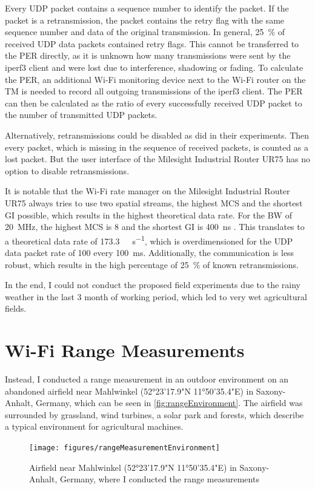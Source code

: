Every \ac{UDP} packet contains a sequence number to identify the packet.
If the packet is a retransmission, the packet contains the retry flag
with the same sequence number and data of the original transmission.
In general, \SI{25}{\percent} of received \ac{UDP} data packets contained retry flags.
This cannot be transferred to the \ac{PER} directly,
as it is unknown how many transmissions were sent by the iperf3 client and were lost due to interference, shadowing or fading.
To calculate the \ac{PER}, an additional Wi-Fi monitoring device next to the Wi-Fi router on the \ac{TM} is needed to record all
outgoing transmissions of the iperf3 client.
The \ac{PER} can then be calculated as the ratio of every successfully received \ac{UDP} packet to the number of transmitted \ac{UDP} packets.

Alternatively, retransmissions could be disabled as \textcite{klingler_agriculture_2018} did in their experiments.
Then every packet, which is missing in the sequence of received packets, is counted as a lost packet.
But the user interface of the Milesight Industrial Router UR75 has no option to disable retransmissions.

It is notable that the Wi-Fi rate manager on the Milesight Industrial Router UR75 always tries to use two spatial streams, the highest \ac{MCS} and the shortest \ac{GI} possible,
which results in the highest theoretical data rate.
For the \ac{BW} of \SI{20}{\mega\hertz}, the highest \ac{MCS} is \num{8} and the shortest \ac{GI} is \SI{400}{\nano\second} \cite{ieee_standard_2020}.
This translates to a theoretical data rate of \SI{173.3}{\mega\bit\per\second}, which is overdimensioned for the \ac{UDP} data packet rate of \SI{100}{\byte}
every \SI{100}{\milli\second}.
Additionally, the communication is less robust, which results in the high percentage of \SI{25}{\percent} of known retransmissions.

In the end, I could not conduct the proposed field experiments due to the rainy weather in the last \num{3} month of working period, which led to very wet agricultural fields.

\section{Wi-Fi Range Measurements}
Instead, I conducted a range measurement in an outdoor environment on an abandoned airfield near Mahlwinkel (52°23'17.9"N 11°50'35.4"E) in Saxony-Anhalt, Germany,
which can be seen in \autoref{fig:rangeEnvironment}.
The airfield was surrounded by grassland, wind turbines, a solar park and forests, which describe a typical environment for agricultural machines.
\begin{figure}[H]%
   \centering
   \texttt{[image: figures/rangeMeasurementEnvironment]}
   \caption{Airfield near Mahlwinkel (52°23'17.9"N 11°50'35.4"E) in Saxony-Anhalt, Germany, where I conducted the range measurements}
   \label{fig:rangeEnvironment}%
\end{figure}

